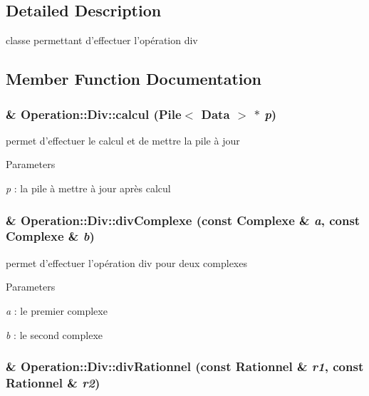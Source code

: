 \subsection{Detailed Description}
classe permettant d'effectuer l'opération div 

\subsection{Member Function Documentation}
\hypertarget{classOperation_1_1Div_a4530654b1b81fdeadb4f1532fcaea85d}{
\subsubsection[{calcul}]{\& Operation::Div::calcul ({\bf Pile}$<$ {\bf Data} $>$ $\ast$ {\em p})}}
\label{classOperation_1_1Div_a4530654b1b81fdeadb4f1532fcaea85d}


permet d'effectuer le calcul et de mettre la pile à jour 


\begin{DoxyParams}{Parameters}
\item[{\em p}]: la pile à mettre à jour après calcul \end{DoxyParams}
\hypertarget{classOperation_1_1Div_a32cea3648beaa64f84b33545a0c328f8}{
\subsubsection[{divComplexe}]{\& Operation::Div::divComplexe (const {\bf Complexe} \& {\em a}, \/  const {\bf Complexe} \& {\em b})}}
\label{classOperation_1_1Div_a32cea3648beaa64f84b33545a0c328f8}


permet d'effectuer l'opération div pour deux complexes 


\begin{DoxyParams}{Parameters}
\item[{\em a}]: le premier complexe \item[{\em b}]: le second complexe \end{DoxyParams}
\hypertarget{classOperation_1_1Div_afbe5105e27ceea4490a71155c7229541}{
\subsubsection[{divRationnel}]{\& Operation::Div::divRationnel (const {\bf Rationnel} \& {\em r1}, \/  const {\bf Rationnel} \& {\em r2})}}
\label{classOperation_1_1Div_afbe5105e27ceea4490a71155c7229541}


